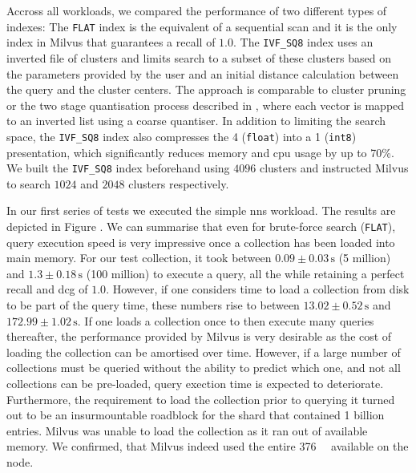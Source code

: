 Accross all workloads, we compared the performance of two different types of indexes: The \texttt{FLAT} index is the equivalent of a sequential scan and it is the only index in Milvus that guarantees a recall of $1.0$. The \texttt{IVF\_SQ8} index uses an inverted file of clusters and limits search to a subset of these clusters based on the parameters provided by the user and an initial distance calculation between the query and the cluster centers. The approach is comparable to cluster pruning \cite{Chierichetti:2007Finding} or the two stage quantisation process described in \cite{Jegou:2010Product}, where each vector is mapped to an inverted list using a coarse quantiser. In addition to limiting the search space, the \texttt{IVF\_SQ8} index also compresses the \SI{4}{\byte} (\texttt{float}) into a \SI{1}{\byte} (\texttt{int8}) presentation, which significantly reduces memory and \acrshort{cpu} usage by up to 70\%. We built the \texttt{IVF\_SQ8} index beforehand using $4096$ clusters and instructed Milvus to search $1024$ and $2048$ clusters respectively.

In our first series of tests we executed the simple \acrshort{nns} workload. The results are depicted in Figure . We can summarise that even for brute-force search (\texttt{FLAT}), query execution speed is very impressive once a collection has been loaded into main memory. For our test collection, it took between $0.09 \pm 0.03 \, \si{\second}$ (5 million) and $1.3 \pm 0.18 \, \si{\second}$ (100 million) to execute a query, all the while retaining a perfect recall and \acrshort{dcg} of $1.0$. However, if one considers time to load a collection from disk to be part of the query time, these numbers rise to between $13.02 \pm 0.52 \, \si{\second}$ and $172.99 \pm 1.02 \, \si{\second}$. If one loads a collection once to then execute many queries thereafter, the performance provided by Milvus is very desirable as the cost of loading the collection can be amortised over time. However, if a large number of collections must be queried without the ability to predict which one, and not all collections can be pre-loaded, query exection time is expected to deteriorate. Furthermore, the requirement to load the collection prior to querying it turned out to be an insurmountable roadblock for the shard that contained 1 billion entries. Milvus was unable to load the collection as it ran out of available memory. We confirmed, that Milvus indeed used the entire \SI{376}{\giga\byte} available on the node.

